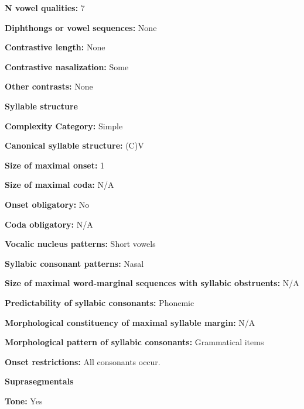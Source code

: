 \textbf{N vowel qualities:} 7



\textbf{Diphthongs or vowel sequences:} None



\textbf{Contrastive length:} None



\textbf{Contrastive nasalization:} Some



\textbf{Other contrasts:} None



\textbf{Syllable structure}



\textbf{Complexity Category:} Simple



\textbf{Canonical syllable structure:} (C)V \citep[6]{Bamgbose1966}



\textbf{Size of maximal onset:} 1



\textbf{Size of maximal coda:} N/A



\textbf{Onset obligatory:} No



\textbf{Coda obligatory:} N/A



\textbf{Vocalic nucleus patterns:} Short vowels



\textbf{Syllabic consonant patterns:} Nasal



\textbf{Size of maximal word{}-marginal sequences with syllabic obstruents:} N/A



\textbf{Predictability of syllabic consonants:} Phonemic



\textbf{Morphological constituency of maximal syllable margin:} N/A



\textbf{Morphological pattern of syllabic consonants:} Grammatical items



\textbf{Onset restrictions:} All consonants occur.



\textbf{Suprasegmentals}



\textbf{Tone:} Yes



